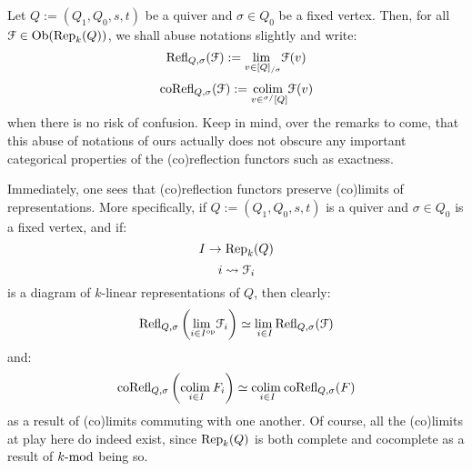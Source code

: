            \begin{convention}
                Let $Q := (Q_1, Q_0, s, t)$ be a quiver and $\sigma \in Q_0$ be a fixed vertex. Then, for all $\calF \in \Ob(\Rep_k(Q))$, we shall abuse notations slightly and write:
                    $$\Refl_{Q, \sigma}(\calF) := \underset{v \in [Q]_{/\sigma}}{\lim} \calF(v)$$
                    $$\co\Refl_{Q, \sigma}(\calF) := \underset{v \in {}^{\sigma/}[Q]}{\colim} \calF(v)$$
                when there is no risk of confusion. Keep in mind, over the remarks to come, that this abuse of notations of ours actually does not obscure any important categorical properties of the (co)reflection functors such as exactness.
            \end{convention}
            \begin{remark}
                Immediately, one sees that (co)reflection functors preserve (co)limits of representations. More specifically, if $Q := (Q_1, Q_0, s, t)$ is a quiver and $\sigma \in Q_0$ is a fixed vertex, and if:
                    $$I \to \Rep_k(Q)$$
                    $$i \mapsto \calF_i$$
                is a diagram of $k$-linear representations of $Q$, then clearly:
                    $$\Refl_{Q, \sigma}\left( \underset{i \in I^{\op}}{\lim} \calF_i \right) \cong \underset{i \in I}{\lim} \Refl_{Q, \sigma}(\calF)$$
                and:
                    $$\co\Refl_{Q, \sigma}\left( \underset{i \in I}{\colim} F_i \right) \cong \underset{i \in I}{\colim} \co\Refl_{Q, \sigma}(F)$$
                as a result of (co)limits commuting with one another. Of course, all the (co)limits at play here do indeed exist, since $\Rep_k(Q)$ is both complete and cocomplete as a result of $k\mod$ being so.
            \end{remark}
